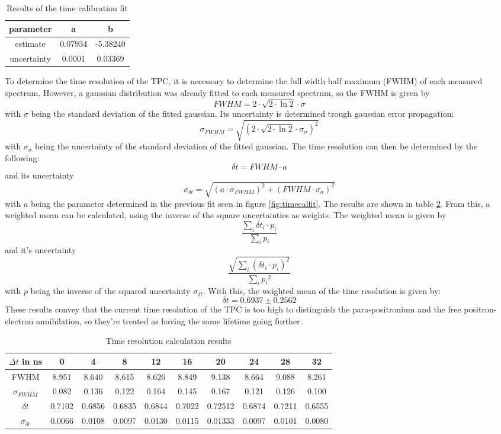 \begin{table}[]
    \centering
    \caption{Results of the time calibration fit}
    \begin{tabular}{cc c}
        parameter & a & b \\ \hline
        estimate & 0.07934 & -5.38240 \\
        uncertainty & 0.0001  &0.03369\\
        \hline
    \end{tabular}
    
    \label{tab:timecalfit}
\end{table}
To determine the time resolution of the TPC, it is necessary to determine the full width half  maximum (FWHM) of each measured spectrum. However, a gaussian distribution was already fitted to each measured spectrum, so the FWHM is given by 
$$FWHM = 2 \cdot \sqrt{2\cdot\ln{2}} \cdot \sigma$$
with $\sigma$ being the standard deviation of the fitted gaussian. Its uncertainty is determined trough gaussian error propagation: 
$$\sigma_{FWHM} = \sqrt{(2 \cdot \sqrt{2\cdot\ln{2}} \cdot \sigma_\sigma)^2}$$
with $\sigma_\sigma$ being the uncertainty of the standard deviation of the fitted gaussian.
The time resolution can then be determined by the following:
$$\delta t = FWHM \cdot a$$ and its uncertainty $$\sigma_{\delta t} = \sqrt{(a \cdot\sigma_{FWHM})^2 + (FWHM \cdot \sigma_a)^2}$$
with $a$ being the parameter determined in the previous fit seen in figure \ref{fig:timecalfit}.
The results are shown in table \ref{tab:time res}. From this, a weighted mean can be calculated, using the inverse of the square uncertainties as weights. 
The weighted mean is given by 
$$\frac{\sum_i{\delta t_i \cdot p_i}}{\sum_i{p_i}}$$
and it's uncertainty
$$\frac{\sqrt{\sum_i{(\delta t_i \cdot p_i)}^2}}{\sum_i{p_i}^2}$$
with $p$ being the inverse of the squared uncertainty $\sigma_{\delta t}$.
With this, the weighted mean of the time resolution is given by: 
$$\delta t = 0.6937 \pm 0.2562$$
These results convey that the current time resolution of the TPC is too high to distinguish the para-positronium and the free positron-electron annihilation, so they're treated as having the same lifetime going further.  

\begin{table}[]
    \centering
    \caption{Time resolution calculation results}
    \begin{tabular}{cccccccccc}
         $\Delta t$ in ns & 0 & 4 & 8 & 12 & 16 &20 & 24 & 28 & 32 \\\hline 
         FWHM & 8.951& 8.640& 8.615 &8.626& 8.849& 9.138& 8.664& 9.088 &8.261 \\
         $\sigma_{FWHM}$ & 0.082 &0.136& 0.122& 0.164& 0.145& 0.167& 0.121& 0.126 &0.100 \\
         $\delta t$ &0.7102 &0.6856 &0.6835 &0.6844& 0.7022 &0.72512
 &0.6874 &0.7211& 0.6555 \\
         $\sigma_{\delta t}$ &0.0066 & 0.0108& 0.0097& 0.0130 &0.0115& 0.01333&
 0.0097& 0.0101 &0.0080 \\\hline
    \end{tabular}
    \label{tab:time res}
\end{table}

